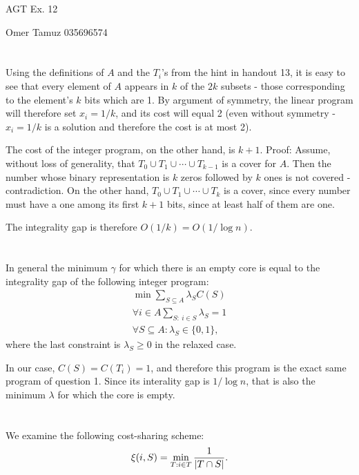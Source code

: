 \documentclass{article}
\begin{document}
AGT Ex. 12

Omer Tamuz 035696574

\section{}
Using the definitions of $A$ and the $T_i$'s from the hint in handout 13, 
it is easy to see that every element of $A$ appears in $k$ of the $2k$
subsets - those corresponding to the element's $k$ bits which are 1. By argument
of symmetry, the linear program will therefore set $x_i = 1/k$, and its
cost will equal 2 (even without symmetry - $x_i=1/k$ is a solution and
therefore the cost is at most 2).

The cost of the integer program, on the other hand, is $k+1$. Proof: 
Assume, without loss of generality, that $T_0\cup T_1 \cup \cdots\cup T_{k-1}$ 
is a cover for $A$. Then the number whose binary representation is $k$ zeros
followed by $k$ ones is not covered - contradiction. On the other hand,
$T_0\cup T_1 \cup \cdots\cup T_{k}$ is a cover, since every number must
have a one among its first $k+1$ bits, since at least half of them are one.

The integrality gap is therefore $O(1/k)=O(1/\log n)$. 

\section{}
In general the minimum $\gamma$ for which there is an empty core is equal to the
integrality gap of the following integer program:
\begin{eqnarray*}
  \min{\sum_{S\subseteq A}{\lambda_S C(S)}}\\
  \forall i\in A \sum_{S:\:i\in S}{\lambda_S}=1\\
  \forall S\subseteq A:\lambda_S\in\{0, 1\},
\end{eqnarray*}
where the last constraint is $\lambda_S\geq 0$ in the relaxed case.

In our case, $C(S)=C(T_i)=1$, and therefore this program is
the exact same program of question 1. Since its interality gap is 
$1/\log n$, that is also the minimum $\lambda$ for which the core is
empty.

\section{}
We examine the following cost-sharing scheme:
\begin{equation}
  \xi(i,S)=\min_{T:i\in T}{1\over |T\cap S|}.
\end{equation}
\end{document}
